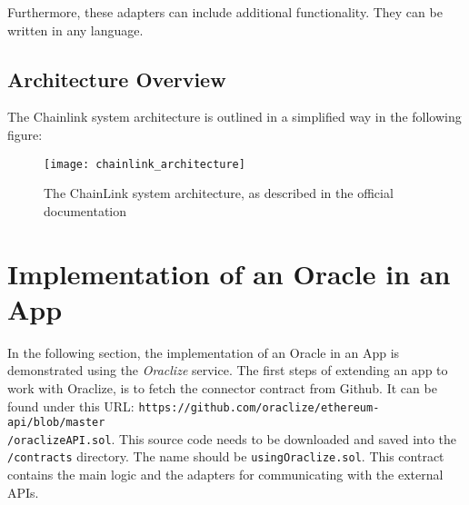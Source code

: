 Furthermore, these adapters can include additional functionality. They can be written in any language\cite{chainlinkdoc}.

\newpage

\subsection*{Architecture Overview}
The Chainlink system architecture is outlined in a simplified way in the following figure:
\begin{figure}[H]
\centering
\texttt{[image: chainlink\_architecture]}
\caption{The ChainLink system architecture, as described in the official documentation\cite{chainlinkdoc}}
\end{figure}

\section{Implementation of an Oracle in an App}
In the following section, the implementation of an Oracle in an App is demonstrated using the \emph{Oraclize} service. The first steps of extending an app to work with Oraclize, is to fetch the connector contract from Github. It can be found under this URL: \texttt{https://github.com/oraclize/ethereum-api/blob/master
\\
/oraclizeAPI.sol}. This source code needs to be downloaded and saved into the \texttt{/contracts} directory. The name should be \texttt{usingOraclize.sol}. This contract contains the main logic and the adapters for communicating with the external APIs.

